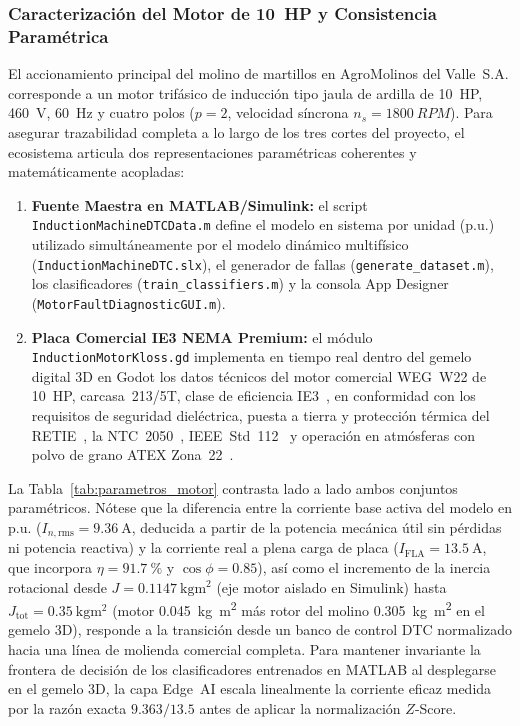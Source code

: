 \subsubsection{Caracterización del Motor de \texorpdfstring{\qty{10}{HP}}{10 HP} y Consistencia Paramétrica}
El accionamiento principal del molino de martillos en AgroMolinos del Valle~S.A. corresponde a un motor trifásico de inducción tipo jaula de ardilla de \qty{10}{HP}, \qty{460}{\volt}, \qty{60}{\hertz} y cuatro polos ($p=2$, velocidad síncrona $n_s=\qty{1800}{RPM}$). Para asegurar trazabilidad completa a lo largo de los tres cortes del proyecto, el ecosistema articula dos representaciones paramétricas coherentes y matemáticamente acopladas:
\begin{enumerate}\setlength{\itemsep}{2pt}\setlength{\topsep}{2pt}
    \item \textbf{Fuente Maestra en MATLAB/Simulink:} el script \texttt{Induction\allowbreak Machine\allowbreak DTC\allowbreak Data.m} define el modelo en sistema por unidad (p.u.) utilizado simultáneamente por el modelo dinámico multifísico (\texttt{Induction\allowbreak Machine\allowbreak DTC.slx}), el generador de fallas (\texttt{generate\_\allowbreak dataset.m}), los clasificadores (\texttt{train\_\allowbreak classifiers.m}) y la consola App Designer (\texttt{Motor\allowbreak Fault\allowbreak Diagnostic\allowbreak GUI.m}).
    \item \textbf{Placa Comercial IE3 NEMA Premium:} el módulo \texttt{Induction\allowbreak Motor\allowbreak Kloss.gd} implementa en tiempo real dentro del gemelo digital 3D en Godot los datos técnicos del motor comercial WEG~W22 de \qty{10}{HP}, carcasa~213/5T, clase de eficiencia IE3~\cite{WEG2024,IEC60034}, en conformidad con los requisitos de seguridad dieléctrica, puesta a tierra y protección térmica del RETIE~\cite{RETIE2024,RETIE2026}, la NTC~2050~\cite{NTC2050}, IEEE~Std~112~\cite{IEEE112} y operación en atmósferas con polvo de grano ATEX Zona~22~\cite{NFPA61}.
\end{enumerate}

La Tabla~\ref{tab:parametros_motor} contrasta lado a lado ambos conjuntos paramétricos. Nótese que la diferencia entre la corriente base activa del modelo en p.u. ($I_{n,\text{rms}}=\qty{9.36}{\ampere}$, deducida a partir de la potencia mecánica útil sin pérdidas ni potencia reactiva) y la corriente real a plena carga de placa ($I_{\text{FLA}}=\qty{13.5}{\ampere}$, que incorpora $\eta=\qty{91.7}{\percent}$ y $\cos\phi=\num{0.85}$), así como el incremento de la inercia rotacional desde $J=\qty{0.1147}{\kilogram\meter\squared}$ (eje motor aislado en Simulink) hasta $J_{\text{tot}}=\qty{0.35}{\kilogram\meter\squared}$ (motor \qty{0.045}{\kilogram\meter\squared} más rotor del molino \qty{0.305}{\kilogram\meter\squared} en el gemelo 3D), responde a la transición desde un banco de control DTC normalizado hacia una línea de molienda comercial completa. Para mantener invariante la frontera de decisión de los clasificadores entrenados en MATLAB al desplegarse en el gemelo 3D, la capa Edge~AI escala linealmente la corriente eficaz medida por la razón exacta $9.363/13.5$ antes de aplicar la normalización $Z$-Score.

